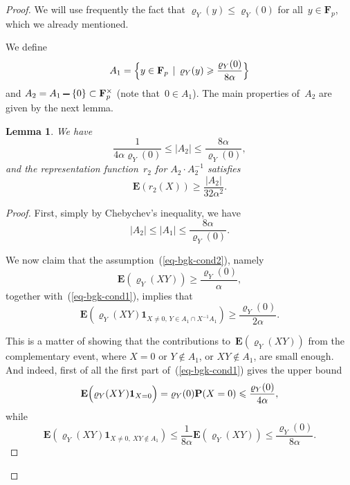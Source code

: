 \documentclass[12pt]{amsart}
\renewcommand{\leq}{\leqslant}
\renewcommand{\geq}{\geqslant}
\numberwithin{equation}{section}
\def\setminus{\mathchoice
    {\mathbin{\vrule height .62ex width 1.61ex depth -.38ex}}%
    {\mathbin{\vrule height .62ex width 1.61ex depth -.38ex}}%
    {\mathbin{\vrule height .50ex width 0.85ex depth -.28ex}}%
    {\mathbin{\vrule height .20ex width 0.570ex depth -.24ex}}%
}
\newcommand{\Ff}{\mathbf{F}}
\newcommand{\proba}{\mathbf{P}}
\newcommand{\expect}{\mathbf{E}}
\newcommand{\charfun}{\mathbf{1}}
\renewcommand{\rho}{\varrho}
\theoremstyle{plain}
\newtheorem{lemma}[theorem]{Lemma}
\theoremstyle{remark}
\theoremstyle{definition}
\renewcommand{\geq}{\geqslant}
\renewcommand{\leq}{\leqslant}
\begin{document}
\begin{proof}%
  We will use frequently the fact that $\rho_Y(y)\leq \rho_Y(0)$ for
  all~$y\in \Ff_p$, which we already mentioned.

  We define
  $$
  A_1=\Bigl\{y\in\Ff_p\,\mid\, \rho_Y(y)\geq
  \frac{\rho_Y(0)}{8\alpha}\Bigr\}
  $$
  and $A_2=A_1\setminus\{0\}\subset \Ff_p^{\times}$ (note
  that~$0\in A_1$).  The main properties of~$A_2$ are given by the next
  lemma.

  \begin{lemma}
    We have
    \begin{equation}\label{eq-bgk-lb2}
      \frac{1}{4\alpha \rho_Y(0)}\leq |A_2|\leq \frac{8\alpha}{\rho_Y(0)},    
    \end{equation}
    and the representation function~$r_2$ for $A_2\cdot A_2^{-1}$
    satisfies
    \begin{equation}\label{eq-r2-lb}
      \expect(r_2(X))\geq \frac{|A_2|}{32\alpha^2}.
    \end{equation}
  \end{lemma}

  \begin{proof}
    First, simply by Chebychev's inequality, we have
    \begin{equation}\label{eq-a2-up}
      |A_2|\leq |A_1|\leq \frac{8\alpha}{\rho_Y(0)}.
    \end{equation}
    
    We now claim that the assumption~(\ref{eq-bgk-cond2}), namely
    $$
    \expect(\rho_Y(XY))\geq \frac{\rho_Y(0)}{\alpha},
    $$
    together with~(\ref{eq-bgk-cond1}), implies that
    \begin{equation}\label{eq-bgk-cond3}
      \expect(\rho_Y(XY)\charfun_{X\not=0,\, Y\in A_1\cap
        X^{-1}A_1})\geq \frac{\rho_Y(0)}{2\alpha}.
    \end{equation}
    
    This is a matter of showing that the contributions
    to~$\expect(\rho_Y(XY))$ from the complementary event, where $X=0$
    or $Y\notin A_1$, or $XY\notin A_1$, are small enough. And indeed,
    first of all the first part of~(\ref{eq-bgk-cond1}) gives the upper
    bound
    $$
    \expect\Bigl(\rho_Y(XY)\charfun_{X=0}\Bigr)=\rho_Y(0)\proba(X=0) \leq
    \frac{\rho_Y(0)}{4\alpha},
    $$
    while
    $$
    \expect(\rho_Y(XY)\charfun_{X\not=0,\ XY\notin A_1}) \leq
    \frac{1}{8\alpha}\expect(\rho_Y(XY))\leq \frac{\rho_Y(0)}{8\alpha}.
    $$
    

\end{proof}
\end{proof}
\end{document}
